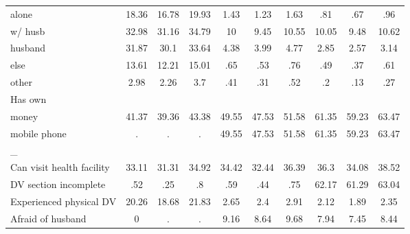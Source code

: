 \begin{tabular}{l*{9}{c}}
alone               &       18.36&       16.78&       19.93&        1.43&        1.23&        1.63&         .81&         .67&         .96\\
w/ husb             &       32.98&       31.16&       34.79&          10&        9.45&       10.55&       10.05&        9.48&       10.62\\
husband             &       31.87&        30.1&       33.64&        4.38&        3.99&        4.77&        2.85&        2.57&        3.14\\
else                &       13.61&       12.21&       15.01&         .65&         .53&         .76&         .49&         .37&         .61\\
other               &        2.98&        2.26&         3.7&         .41&         .31&         .52&          .2&         .13&         .27\\
\midrule
Has own             &            &            &            &            &            &            &            &            &            \\
money               &       41.37&       39.36&       43.38&       49.55&       47.53&       51.58&       61.35&       59.23&       63.47\\
mobile phone        &           .&           .&           .&       49.55&       47.53&       51.58&       61.35&       59.23&       63.47\\
\midrule
\_                   &            &            &            &            &            &            &            &            &            \\
Can visit health facility&       33.11&       31.31&       34.92&       34.42&       32.44&       36.39&        36.3&       34.08&       38.52\\
DV section incomplete&         .52&         .25&          .8&         .59&         .44&         .75&       62.17&       61.29&       63.04\\
Experienced physical DV&       20.26&       18.68&       21.83&        2.65&         2.4&        2.91&        2.12&        1.89&        2.35\\
Afraid of husband   &           0&           .&           .&        9.16&        8.64&        9.68&        7.94&        7.45&        8.44\\
\bottomrule
\end{tabular}
